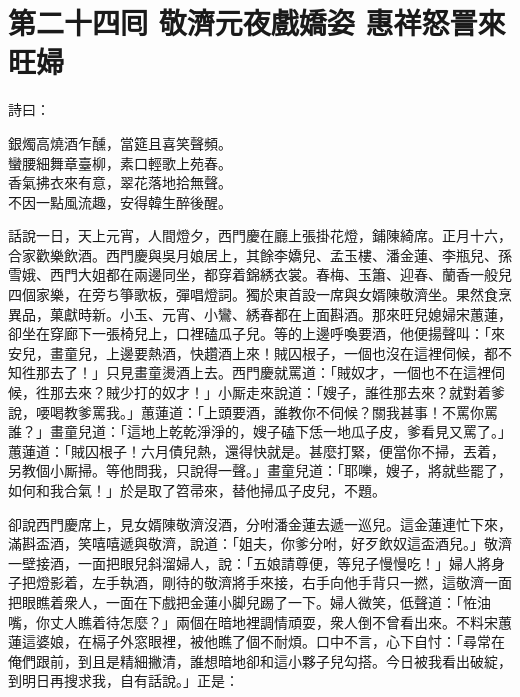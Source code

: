 
\chapter*{第二十四囘 敬濟元夜戲嬌姿 惠祥怒詈來旺婦}


詩曰：

\begin{myquote} 
銀燭高燒酒乍醺，當筵且喜笑聲頻。\\蠻腰細舞章臺柳，素口輕歌上苑春。\\香氣拂衣來有意，翠花落地拾無聲。\\不因一點風流趣，安得韓生醉後醒。
\end{myquote} 

話說一日，天上元宵，人間燈夕，西門慶在廳上張掛花燈，鋪陳綺席。正月十六，合家歡樂飲酒。西門慶與吳月娘居上，其餘李嬌兒、孟玉樓、潘金蓮、李瓶兒、孫雪娥、西門大姐都在兩邊同坐，都穿着錦綉衣裳。春梅、玉簫、迎春、蘭香一般兒四個家樂，在旁ち箏歌板，彈唱燈詞。獨於東首設一席與女婿陳敬濟坐。果然食烹異品，菓獻時新。小玉、元宵、小鸞、綉春都在上面斟酒。那來旺兒媳婦宋蕙蓮，卻坐在穿廊下一張椅兒上，口裡磕瓜子兒。等的上邊呼喚要酒，他便揚聲叫：「來安兒，畫童兒，上邊要熱酒，快趲酒上來！賊囚根子，一個也沒在這裡伺候，都不知徃那去了！」{}只見畫童燙酒上去。西門慶就罵道：「賊奴才，一個也不在這裡伺候，徃那去來？賊少打的奴才！」{}小厮走來說道：「嫂子，誰徃那去來？就對着爹說，喓喝教爹罵我。」蕙蓮道：「上頭要酒，誰教你不伺候？關我甚事！不罵你罵誰？」畫童兒道：「這地上乾乾淨淨的，嫂子磕下恁一地瓜子皮，爹看見又罵了。」蕙蓮道：「賊囚根子！六月債兒熱，還得快就是。甚麼打緊，便當你不掃，丟着，另教個小厮掃。等他問我，只說得一聲。」畫童兒道：「耶嚛，嫂子，將就些罷了，如何和我合氣！」於是取了笤帚來，替他掃瓜子皮兒，不題。

卻說西門慶席上，見女婿陳敬濟沒酒，分咐潘金蓮去遞一巡兒。{}{}這金蓮連忙下來，滿斟盃酒，笑嘻嘻遞與敬濟，說道：「姐夫，你爹分咐，好歹飲奴這盃酒兒。」敬濟一壁接酒，一面把眼兒斜溜婦人，說：「五娘請尊便，等兒子慢慢吃！」婦人將身子把燈影着，左手執酒，剛待的敬濟將手來接，右手向他手背只一撚，這敬濟一面把眼瞧着衆人，一面在下戲把金蓮小脚兒踢了一下。婦人微笑，低聲道：「恠油嘴，你丈人瞧着待怎麼？」兩個在暗地裡調情頑耍，衆人倒不曾看出來。{}不料宋蕙蓮這婆娘，在槅子外窓眼裡，被他瞧了個不耐煩。{}口中不言，心下自忖：「尋常在俺們跟前，到且是精細撇清，誰想暗地卻和這小夥子兒勾搭。今日被我看出破綻，到明日再搜求我，自有話說。」正是：

